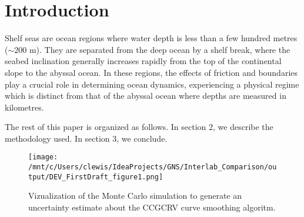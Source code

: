 \section{\Large{Introduction}}
Shelf seas are ocean regions where water depth is less than a few hundred metres ($\sim 200$ m). They are separated from the deep ocean by a shelf break, where the seabed inclination generally increases rapidly from the top of the continental slope to the abyssal ocean. In these regions, the effects of friction and boundaries play a crucial role in determining ocean dynamics, experiencing a
physical regime which is distinct from that of the abyssal ocean where depths are measured in kilometres. 

The rest of this paper is organized as follows. In section 2, we
describe the methodology used. In section 3, we conclude.

\begin{figure}[h!]
  \texttt{[image: /mnt/c/Users/clewis/IdeaProjects/GNS/Interlab\_Comparison/output/DEV\_FirstDraft\_figure1.png]}
  \caption{Vizualization of the Monte Carlo simulation to generate an uncertainty estimate about the CCGCRV curve smoothing algoritm. }
  \label{fig:montecarloexplained}
\end{figure}